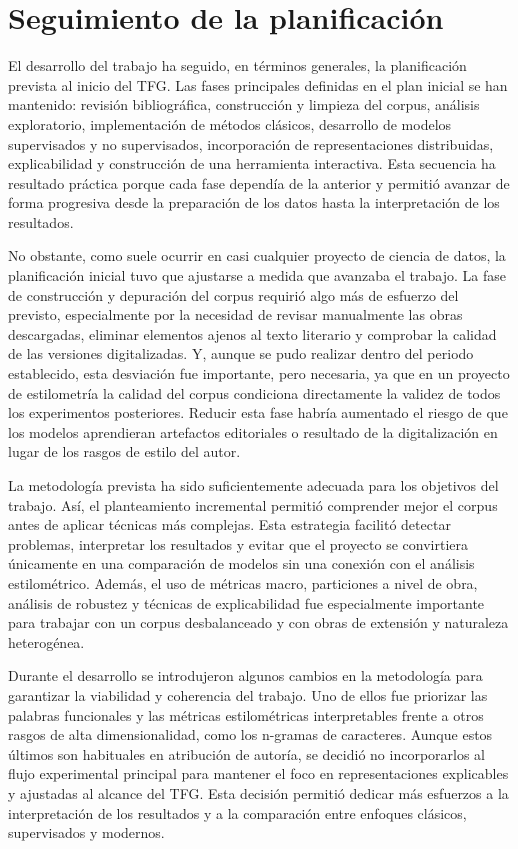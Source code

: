 \documentclass[IB]{TFUOC}%
\begin{document}
\section{Seguimiento de la planificación}

El desarrollo del trabajo ha seguido, en términos generales, la planificación prevista al inicio del TFG. Las fases principales definidas en el plan inicial se han mantenido: revisión bibliográfica, construcción y limpieza del corpus, análisis exploratorio, implementación de métodos clásicos, desarrollo de modelos supervisados y no supervisados, incorporación de representaciones distribuidas, explicabilidad y construcción de una herramienta interactiva. Esta secuencia ha resultado práctica porque cada fase dependía de la anterior y permitió avanzar de forma progresiva desde la preparación de los datos hasta la interpretación de los resultados.

No obstante, como suele ocurrir en casi cualquier proyecto de ciencia de datos, la planificación inicial tuvo que ajustarse a medida que avanzaba el trabajo. La fase de construcción y depuración del corpus requirió algo más de esfuerzo del previsto, especialmente por la necesidad de revisar manualmente las obras descargadas, eliminar elementos ajenos al texto literario y comprobar la calidad de las versiones digitalizadas. Y, aunque se pudo realizar dentro del periodo establecido, esta desviación fue importante, pero necesaria, ya que en un proyecto de estilometría la calidad del corpus condiciona directamente la validez de todos los experimentos posteriores. Reducir esta fase habría aumentado el riesgo de que los modelos aprendieran artefactos editoriales o resultado de la digitalización en lugar de los rasgos de estilo del autor.

La metodología prevista ha sido suficientemente adecuada para los objetivos del trabajo. Así, el planteamiento incremental permitió comprender mejor el corpus antes de aplicar técnicas más complejas. Esta estrategia facilitó detectar problemas, interpretar los resultados y evitar que el proyecto se convirtiera únicamente en una comparación de modelos sin una conexión con el análisis estilométrico. Además, el uso de métricas macro, particiones a nivel de obra, análisis de robustez y técnicas de explicabilidad fue especialmente importante para trabajar con un corpus desbalanceado y con obras de extensión y naturaleza heterogénea.

Durante el desarrollo se introdujeron algunos cambios en la metodología para garantizar la viabilidad y coherencia del trabajo. Uno de ellos fue priorizar las palabras funcionales y las métricas estilométricas interpretables frente a otros rasgos de alta dimensionalidad, como los n-gramas de caracteres. Aunque estos últimos son habituales en atribución de autoría, se decidió no incorporarlos al flujo experimental principal para mantener el foco en representaciones explicables y ajustadas al alcance del TFG. Esta decisión permitió dedicar más esfuerzos a la interpretación de los resultados y a la comparación entre enfoques clásicos, supervisados y modernos.
\end{document}
